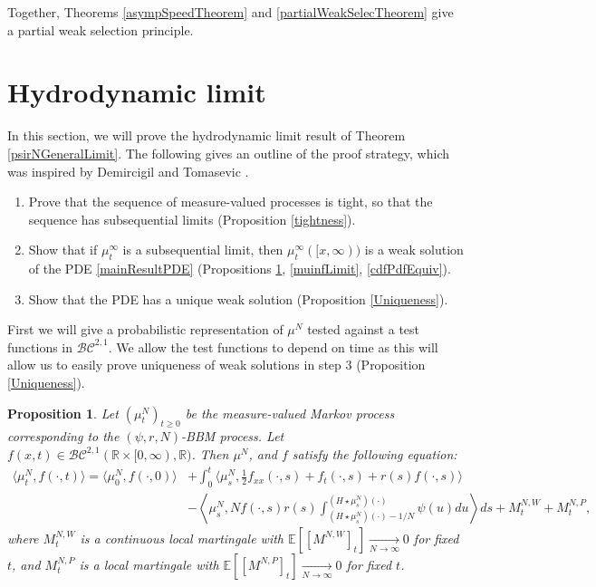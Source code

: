 \documentclass{article}
\newtheorem{propn}[theorem]{Proposition}
\newcommand{\B}[1]{\mathbb{#1}}
\newcommand{\C}[1]{\mathcal{#1}}
\begin{document}
Together, Theorems \ref{asympSpeedTheorem} and \ref{partialWeakSelecTheorem} give a partial weak selection principle.

\section{Hydrodynamic limit}

In this section, we will prove the hydrodynamic limit result of Theorem \ref{psirNGeneralLimit}. The following gives an outline of the proof strategy, which was inspired by Demircigil and Tomasevic \cite{demircigilTomasevic}.
\begin{enumerate}
    \item Prove that the sequence of measure-valued processes is tight, so that the sequence has subsequential limits (Proposition \ref{tightness}).
    \item Show that if $\mu^\infty_t$ is a subsequential limit, then $\mu^\infty_t([x,\infty))$ is a weak solution of the PDE \eqref{mainResultPDE} (Propositions \ref{weakRepPropn}, \ref{muinfLimit}, \ref{cdfPdfEquiv}). 
    \item Show that the PDE has a unique weak solution (Proposition \ref{Uniqueness}).
\end{enumerate} 

First we will give a probabilistic representation of $\mu^N$ tested against a test functions in $\C{BC}^{2,1}$. We allow the test functions to depend on time as this will allow us to easily prove uniqueness of weak solutions in step 3 (Proposition \ref{Uniqueness}).

\vspace{1em}

\begin{propn} \label{weakRepPropn}
    Let $(\mu_t^N)_{t\geq 0}$ be the measure-valued Markov process corresponding to the $(\psi,r,N)$-BBM process. Let $f(x,t)\in \C{BC}^{2,1}(\B{R}\times [0,\infty),\B{R})$. Then $\mu^N$, and $f$ satisfy the following equation:
    \begin{align}\label{weakRep}\langle \mu_t^N,f(\cdot,t)\rangle = \langle \mu_0^N, f(\cdot,0)\rangle &+ \int_0^t \langle \mu_s^N, \frac12 f_{xx}(\cdot,s) + f_t(\cdot,s) + r(s)f(\cdot,s)\rangle \\
    \nonumber&-\left\langle \mu_s^N, Nf(\cdot,s)r(s)\int_{(H\star \mu^N_s)(\cdot)-1/N}^{(H\star \mu^N_s)(\cdot)}\psi(u)du\right\rangle ds + M_t^{N,W} + M_t^{N,P},\end{align}
    where $M^{N,W}_t$ is a continuous local martingale with $\B{E}[[M^{N,W}]_t]\xrightarrow[N\to\infty]{}0$ for fixed $t$, and $M^{N,P}_t$ is a local martingale with $\B{E}[[M^{N,P}]_t]\xrightarrow[N\to\infty]{}0$ for fixed $t$.
\end{propn}
\end{document}
